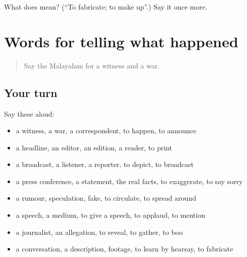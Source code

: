 \begin{tcolorbox}[breakable,colback=teal!4,colframe=teal!35!black,title={Before you move on}]
What does  mean? (\textquotedblleft{}To fabricate; to make up\textquotedblright{}.) Say it once more.
\end{tcolorbox}
\section[(dialogue)]{Words for telling what happened}

\label{lesson:ML-R356-review-349-356}



\begin{quote}
Say the Malayalam for a witness and a war.
\end{quote}

\subsection*{Your turn}
Say these aloud:

\begin{itemize}
\raggedright
  \item a witness, a war, a correspondent, to happen, to announce
  \item a headline, an editor, an edition, a reader, to print
  \item a broadcast, a listener, a reporter, to depict, to broadcast
  \item a press conference, a statement, the real facts, to exaggerate, to say sorry
  \item a rumour, speculation, fake, to circulate, to spread around
  \item a speech, a medium, to give a speech, to applaud, to mention
  \item a journalist, an allegation, to reveal, to gather, to boo
  \item a conversation, a description, footage, to learn by hearsay, to fabricate
\end{itemize}

